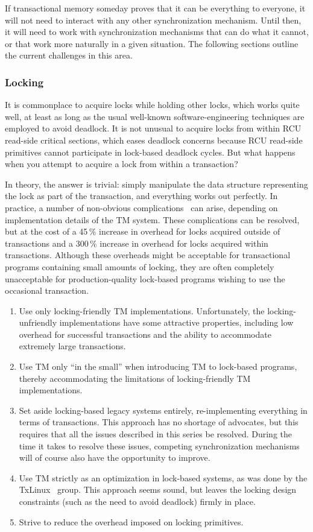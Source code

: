 If transactional memory someday proves that it can be everything to everyone,
it will not need to interact with any other synchronization mechanism.
Until then, it will need to work with synchronization mechanisms that
can do what it cannot, or that work more naturally in a given situation.
The following sections outline the current challenges in this area.

\subsubsection{Locking}
\label{sec:future:Locking}

It is commonplace to acquire locks while holding other locks, which works
quite well, at least as long as the usual well-known software-engineering
techniques are employed to avoid deadlock.
It is not unusual to acquire locks from within RCU read-side critical
sections, which eases deadlock concerns because RCU read-side primitives
cannot participate in lock-based deadlock cycles.
But what happens when you attempt to acquire a lock from within a transaction?

In theory, the answer is trivial: simply manipulate the data structure
representing the lock as part of the transaction, and everything works
out perfectly.
In practice, a number of non-obvious complications~\cite{Volos2008TRANSACT}
can arise, depending on implementation details of the TM system.
These complications can be resolved, but at the cost of a 45\,\% increase in
overhead for locks acquired outside of transactions and a 300\,\% increase
in overhead for locks acquired within transactions.
Although these overheads might be acceptable for transactional
programs containing small amounts of locking, they are often completely
unacceptable for production-quality lock-based programs wishing to use
the occasional transaction.

\begin{enumerate}
\item	Use only locking-friendly TM implementations.
	Unfortunately, the locking-unfriendly implementations have some
	attractive properties, including low overhead for successful
	transactions and the ability to accommodate extremely large
	transactions.
\item	Use TM only ``in the small'' when introducing TM to lock-based
	programs, thereby accommodating the limitations of
	locking-friendly TM implementations.
\item	Set aside locking-based legacy systems entirely, re-implementing
	everything in terms of transactions.
	This approach has no shortage of advocates, but this requires
	that all the issues described in this series be resolved.
	During the time it takes to resolve these issues, competing
	synchronization mechanisms will of course also have the
	opportunity to improve.
\item	Use TM strictly as an optimization in lock-based systems, as was
	done by the TxLinux~\cite{ChistopherJRossbach2007a} group.
	This approach seems sound, but leaves the locking design
	constraints (such as the need to avoid deadlock) firmly in place.
\item	Strive to reduce the overhead imposed on locking primitives.
\end{enumerate}

